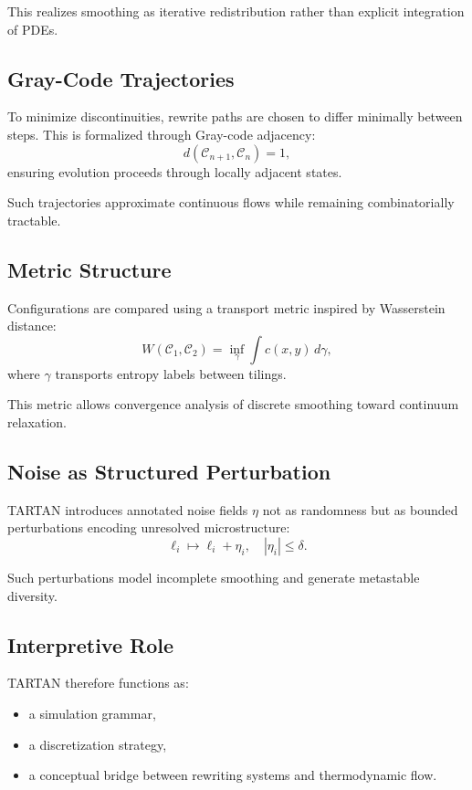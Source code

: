 \documentclass[12pt]{article}
\begin{document}
This realizes smoothing as iterative redistribution rather than explicit integration of PDEs.

\subsection{Gray-Code Trajectories}

To minimize discontinuities, rewrite paths are chosen to differ minimally between steps. This is formalized through Gray-code adjacency:
\[
d(\mathcal{C}_{n+1},\mathcal{C}_n)=1,
\]
ensuring evolution proceeds through locally adjacent states.

Such trajectories approximate continuous flows while remaining combinatorially tractable.

\subsection{Metric Structure}

Configurations are compared using a transport metric inspired by Wasserstein distance:
\[
W(\mathcal{C}_1,\mathcal{C}_2)=\inf_{\gamma}\int c(x,y)\,d\gamma,
\]
where $\gamma$ transports entropy labels between tilings.

This metric allows convergence analysis of discrete smoothing toward continuum relaxation.

\subsection{Noise as Structured Perturbation}

TARTAN introduces annotated noise fields $\eta$ not as randomness but as bounded perturbations encoding unresolved microstructure:
\[
\ell_i \mapsto \ell_i + \eta_i, \quad |\eta_i| \le \delta.
\]

Such perturbations model incomplete smoothing and generate metastable diversity.

\subsection{Interpretive Role}

TARTAN therefore functions as:

\begin{itemize}
\item a simulation grammar,
\item a discretization strategy,
\item a conceptual bridge between rewriting systems and thermodynamic flow.
\end{itemize}
\end{document}
